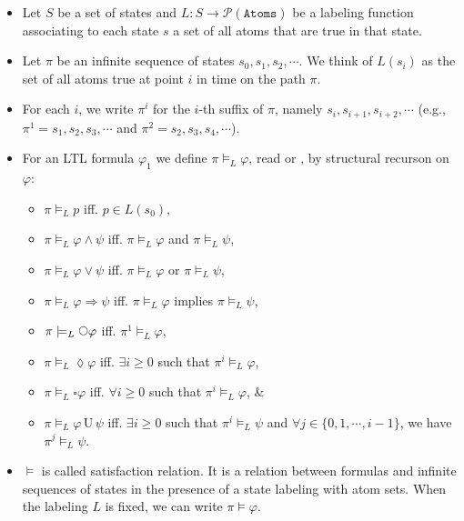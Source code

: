 \documentclass[12pt]{article}
\newcommand{\imp}{\Rightarrow}
\newcommand{\until}{\,\mathrm{U}\,}
\newcommand{\iscircle}{\mathord{\scalerel*{\bigcirc}{\square}}}
\begin{document}
    \begin{itemize}
        \item Let $S$ be a set of states and $L: S \rightarrow \mathcal{P}(\texttt{Atoms})$ be a labeling function associating to each state $s$ a set of all atoms that are true in that state.
        \item Let $\pi$ be an infinite sequence of states $s_0, s_1, s_2, \cdots$.
        We think of $L(s_i)$ as the set of all atoms true at point $i$ in time on the path $\pi$.
        \item For each $i$, we write $\pi^i$ for the $i$-th suffix of $\pi$, namely $s_i, s_{i+1}, s_{i+2}, \cdots$ (e.g., $\pi^1 = s_1, s_2, s_3, \cdots$ and $\pi^2 = s_2, s_3, s_4, \cdots$).
        \item For an LTL formula $\varphi_1$ we define $\pi \models_L \varphi$, read  or , by structural recurson on $\varphi$:
        \begin{itemize}
            \item $\pi \models_L p$ iff. $p \in L(s_0)$,
            \item $\pi \models_L \varphi \land \psi$ iff. $\pi \models_L \varphi$ and $\pi \models_L \psi$,
            \item $\pi \models_L \varphi \lor \psi$ iff. $\pi \models_L \varphi$ or $\pi \models_L \psi$,
            \item $\pi \models_L \varphi \imp \psi$ iff. $\pi \models_L \varphi$ implies $\pi \models_L \psi$,
            \item $\pi \models_L \iscircle\varphi$ iff. $\pi^1 \models_L \varphi$,
            \item $\pi \models_L \lozenge\varphi$ iff. $\exists{i} \geq 0$ such that $\pi^i \models_L \varphi$,
            \item $\pi \models_L \square\varphi$ iff. $\forall{i} \geq 0$ such that $\pi^i \models_L \varphi$, \&
            \item $\pi \models_L \varphi \until \psi$ iff. $\exists{i} \geq 0$ such that $\pi^i \models_L \psi$ and $\forall{j} \in \{0, 1, \cdots, i-1\}$, we have $\pi^j \models_L \psi$.
        \end{itemize}
        \item $\models$ is called satisfaction relation.
        It is a relation between formulas and infinite sequences of states in the presence of a state labeling with atom sets.
        When the labeling $L$ is fixed, we can write $\pi \models \varphi$.
    \end{itemize}
\end{document}
